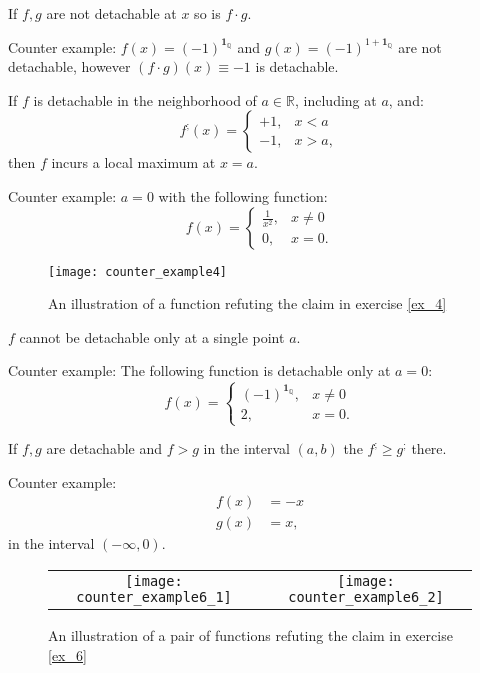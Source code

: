 \documentclass[11pt]{book}
\begin{document}
\begin{exercise}If $f,g$ are not detachable at $x$ so is $f\cdot g$.
\end{exercise}

Counter example: $f\left(x\right)=\left(-1\right)^{\boldsymbol{1}_{\mathbb{Q}}}$
and $g\left(x\right)=\left(-1\right)^{1+\boldsymbol{1}_{\mathbb{Q}}}$
are not detachable, however $\left(f\cdot g\right)\left(x\right)\equiv-1$
is detachable.

\begin{exercise}\label{ex_4}If $f$ is detachable in the neighborhood of $a\in\mathbb{R}$,
including at $a$, and:
\[
f^{;}\left(x\right)=\begin{cases}
+1, & x<a\\
-1, & x>a,
\end{cases}
\]
then $f$ incurs a local maximum at $x=a$.
\end{exercise}

Counter example: $a=0$ with the following function:
\[
f\left(x\right)=\begin{cases}
\frac{1}{x^{2}}, & x\neq0\\
0, & x=0.
\end{cases}
\]

\begin{figure}[h!]
\texttt{[image: counter\_example4]}
\label{one_over_x_square}
\caption{An illustration of a function refuting the claim in exercise \ref{ex_4}}
\end{figure}

\begin{exercise}$f$ cannot be detachable only at a single point $a$.
\end{exercise}

Counter example: The following function is detachable only at $a=0$:
\[
f\left(x\right)=\begin{cases}
\left(-1\right)^{\boldsymbol{1}_{\mathbb{Q}}}, & x\neq0\\
2, & x=0.
\end{cases}
\]

\begin{exercise}\label{ex_6}If $f,g$ are detachable and $f>g$ in the interval $\left(a,b\right)$
the $f^{;}\geq g^{;}$ there.
\end{exercise}

Counter example:
\begin{align*}
f\left(x\right) & =-x\\
g\left(x\right) & =x,
\end{align*}
in the interval $\left(-\infty,0\right)$.
\begin{figure}[h!]
\begin{tabular}{cc}
  \texttt{[image: counter\_example6\_1]} &   \texttt{[image: counter\_example6\_2]} \\
\end{tabular}
\caption{An illustration of a pair of functions refuting the claim in exercise \ref{ex_6}}
\end{figure}
\end{document}
